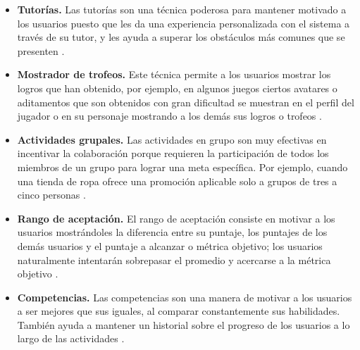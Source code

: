     \begin{itemize}

    \item
    {\bf Tutorías.}
        Las tutorías son una técnica poderosa para mantener motivado a los usuarios
        puesto que les da una experiencia personalizada con el sistema a través de su
        tutor, y les ayuda a superar los obstáculos más comunes que se presenten
        \cite[p. 215]{Octalysis}.

    \item
    {\bf Mostrador de trofeos.}
        Este técnica permite a los usuarios mostrar los logros que han obtenido,
        por ejemplo, en algunos juegos ciertos avatares o aditamentos que son
        obtenidos con gran dificultad se muestran en el perfil del jugador o en
        su personaje mostrando a los demás sus logros o trofeos
        \cite[p. 218]{Octalysis}.

    \item
    {\bf Actividades grupales.}
        Las actividades en grupo son muy efectivas en incentivar la colaboración
        porque requieren la participación de todos los miembros de un grupo para
        lograr una meta específica. Por ejemplo, cuando una tienda de ropa ofrece
        una promoción aplicable solo a grupos de tres a cinco personas
        \cite[p. 221]{Octalysis}.

    \item
    {\bf Rango de aceptación.}
        El rango de aceptación consiste en motivar a los usuarios mostrándoles
        la diferencia entre su puntaje, los puntajes de los demás usuarios 
        y el puntaje a alcanzar o métrica objetivo; los usuarios naturalmente
        intentarán sobrepasar el promedio y acercarse a la métrica objetivo
        \cite[p. 226]{Octalysis}.

    \item
    {\bf Competencias.}
        Las competencias son una manera de motivar a los usuarios a ser mejores
        que sus iguales, al comparar constantemente sus habilidades. También ayuda
        a mantener un historial sobre el progreso de los usuarios a lo largo de las
        actividades \cite[p. 210]{Octalysis}.


    \end{itemize}

